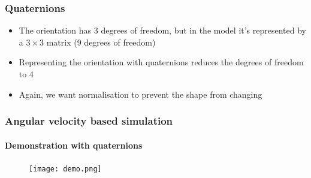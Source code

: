 \documentclass{beamer}
\begin{document}
\begin{frame}
 \frametitle{Quaternions} 
 \begin{itemize}
  \item The orientation has 3 degrees of freedom, but in the model it's represented by a $3 \times 3$ matrix (9 degrees of freedom)
  \item Representing the orientation with quaternions reduces the degrees of freedom to 4
  \item Again, we want normalisation to prevent the shape from changing
 \end{itemize}
\end{frame}

\begin{frame}
 \frametitle{Angular velocity based simulation}
 \framesubtitle{Demonstration with quaternions}
 \begin{figure}
  \centering
  \texttt{[image: demo.png]}
 \end{figure}
\end{frame}
\end{document}
